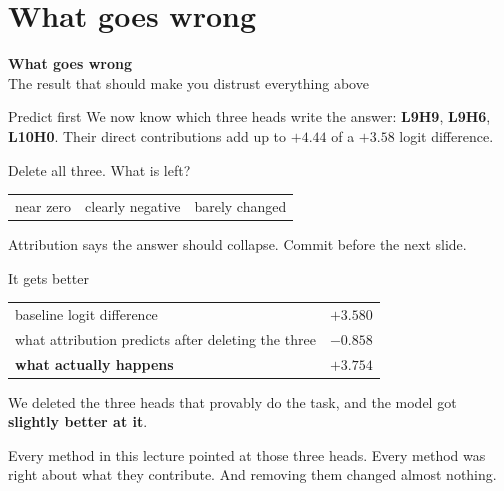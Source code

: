 \documentclass[aspectratio=169]{beamer}
\newcommand{\trapbox}[1]{%
  \begin{tcolorbox}[colback=armred!8, colframe=armred, boxrule=0.6pt, arc=2pt]
  #1
  \end{tcolorbox}}
\newcommand{\sectiontransition}[2]{%
  \begin{frame}[plain]
    \vfill
    \begin{center}
      {\Huge\bfseries\color{popblue} #1}\\[1.1em]
      {\large #2}
    \end{center}
    \vfill
  \end{frame}}
\begin{document}
\section{What goes wrong}
\sectiontransition{What goes wrong}{The result that should make you distrust everything above}

\begin{frame}{Predict first}
  \vspace{0.9em}
  We now know which three heads write the answer: \textbf{L9H9}, \textbf{L9H6}, \textbf{L10H0}.
  Their direct contributions add up to $+4.44$ of a $+3.58$ logit difference.

  \vspace{1.2em}
  \begin{center}
    {\large Delete all three. What is left?}
  \end{center}

  \vspace{1.2em}
  \begin{center}
  \small
  \begin{tabular}{@{}ccc@{}}
    near zero & clearly negative & barely changed\\
  \end{tabular}
  \end{center}

  \vspace{1.0em}
  \begin{center}
    {\footnotesize Attribution says the answer should collapse. Commit before the next slide.}
  \end{center}
\end{frame}

\begin{frame}{It gets better}
  \vspace{0.9em}
  \begin{center}
  \small
  \begin{tabular}{@{}lr@{}}
    \toprule
    baseline logit difference & $+3.580$\\
    what attribution predicts after deleting the three & $-0.858$\\
    \midrule
    \textbf{what actually happens} & $\mathbf{+3.754}$\\
    \bottomrule
  \end{tabular}
  \end{center}

  \vspace{1.1em}
  \trapbox{We deleted the three heads that provably do the task, and the model got
  \textbf{slightly better at it}.}

  \vspace{1.0em}
  Every method in this lecture pointed at those three heads. Every method was right about what
  they contribute. And removing them changed almost nothing.
\end{frame}
\end{document}
